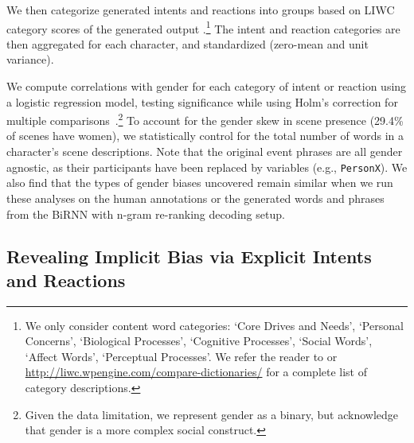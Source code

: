 \documentclass[11pt,a4paper]{article}
\begin{document}
We then categorize generated intents and reactions into groups based on LIWC category
scores  of the generated output \cite{Tausczik2016-rd}.\footnote{We only consider content word categories: 
`Core Drives and Needs', `Personal Concerns', `Biological Processes', `Cognitive Processes', `Social Words', `Affect Words', `Perceptual Processes'.
We refer the reader to \citet{Tausczik2016-rd} or \url{http://liwc.wpengine.com/compare-dictionaries/} for a complete list of category descriptions.
}
The intent and reaction categories are then aggregated for each character, and 
standardized (zero-mean and unit variance).

We compute correlations with gender for each category of intent or reaction using a logistic regression model, testing significance while using Holm's correction for multiple comparisons~\cite{holm1979simple}.\footnote{Given the data limitation, we represent gender as a binary, but acknowledge that gender is a more complex social construct.}
To account for the gender skew in scene presence (29.4\% of scenes have women), we statistically control for the total number of words in a character's scene descriptions.
Note that the original event phrases are all gender agnostic, as their participants have been replaced by variables (e.g., \texttt{PersonX}). We also find that the types of gender biases uncovered remain similar when we run these analyses on the human annotations or the generated words and phrases from the BiRNN with n-gram re-ranking decoding setup.



\subsection{Revealing Implicit Bias via Explicit Intents and Reactions}
\end{document}
